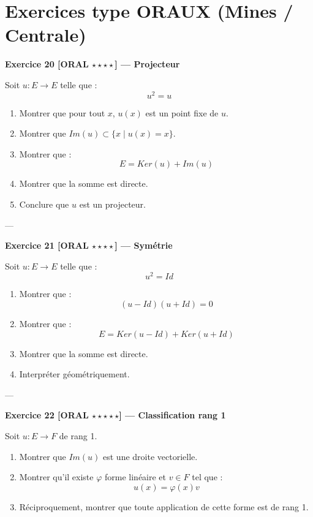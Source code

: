 \documentclass[11pt,a4paper]{article}
\begin{document}
\section{Exercices type ORAUX (Mines / Centrale)}

\textbf{Exercice 20 [ORAL $\star\star\star\star$] — Projecteur}

Soit $u : E \to E$ telle que :
\[
u^2 = u
\]

\begin{enumerate}
\item Montrer que pour tout $x$, $u(x)$ est un point fixe de $u$.
\item Montrer que $Im(u) \subset \{x \mid u(x)=x\}$.
\item Montrer que :
\[
E = Ker(u) + Im(u)
\]
\item Montrer que la somme est directe.
\item Conclure que $u$ est un projecteur.
\end{enumerate}

---

\textbf{Exercice 21 [ORAL $\star\star\star\star$] — Symétrie}

Soit $u : E \to E$ telle que :
\[
u^2 = Id
\]

\begin{enumerate}
\item Montrer que :
\[
(u-Id)(u+Id)=0
\]
\item Montrer que :
\[
E = Ker(u-Id) + Ker(u+Id)
\]
\item Montrer que la somme est directe.
\item Interpréter géométriquement.
\end{enumerate}

---

\textbf{Exercice 22 [ORAL $\star\star\star\star\star$] — Classification rang 1}

Soit $u : E \to F$ de rang 1.

\begin{enumerate}
\item Montrer que $Im(u)$ est une droite vectorielle.
\item Montrer qu’il existe $\varphi$ forme linéaire et $v \in F$ tel que :
\[
u(x) = \varphi(x) v
\]
\item Réciproquement, montrer que toute application de cette forme est de rang 1.
\end{enumerate}
\end{document}
